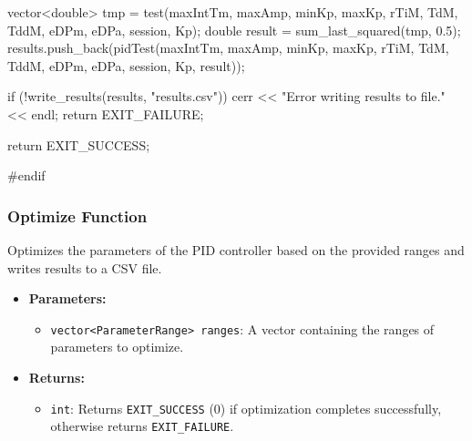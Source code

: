\documentclass[a4paper,12pt]{report}
\begin{document}
\begin{lstlising}[language=C++]
{{{{{{{{{{{                                                                                        {
                                                                                                vector<double> tmp = test(maxIntTm, maxAmp, minKp, maxKp, rTiM, TdM, TddM, eDPm, eDPa, session, Kp);
                                                                                                double result = sum_last_squared(tmp, 0.5);
                                                                                                results.push_back(pidTest({maxIntTm, maxAmp, minKp, maxKp, rTiM, TdM, TddM, eDPm, eDPa, session, Kp, result}));
                                                                                        }
                                                                                }
                                                                        }
                                                                }
                                                        }
                                                }
                                        }
                                }
                        }
                }
        }

        if (!write_results(results, "results.csv"))
        {
                cerr << "Error writing results to file." << endl;
                return EXIT_FAILURE;
        }

        return EXIT_SUCCESS;
}

#endif
\end{lstlising}
\subsubsection{Optimize Function}
Optimizes the parameters of the PID controller based on the provided ranges and writes results to a CSV file.
\begin{itemize}
\item \textbf{Parameters:}
\begin{itemize}
\item \texttt{vector<ParameterRange> ranges}: A vector containing the ranges of parameters to optimize.
\end{itemize}
\item \textbf{Returns:}
\begin{itemize}
\item \texttt{int}: Returns \texttt{EXIT\_SUCCESS} (0) if optimization completes successfully, otherwise returns \texttt{EXIT\_FAILURE}.
\end{itemize}
\end{itemize}
\end{document}
